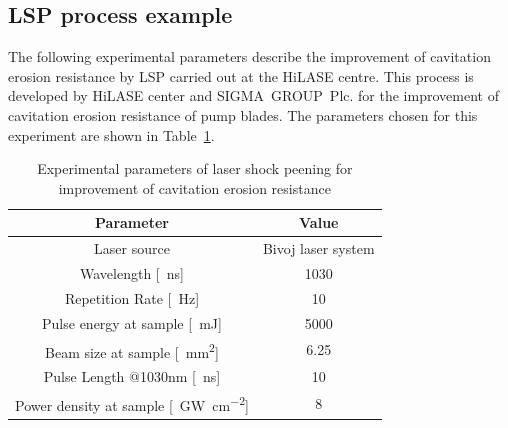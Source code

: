 \subsection{LSP process example}

The following experimental parameters describe the improvement of cavitation erosion resistance by LSP carried out at the HiLASE centre. This process is developed by HiLASE center and SIGMA~GROUP~Plc. for the improvement of cavitation erosion resistance of pump blades. The parameters chosen for this experiment are shown in Table~\ref{experimentalparameters}. 

\begin{table}[H]
\centering
    
    \begin{threeparttable}
            \caption[Experimental parameters of laser shock peening]{Experimental parameters of laser shock peening for improvement of cavitation erosion resistance}
        \begin{tabular}{|c | c|} 
        \hline
            \textbf{Parameter} & \textbf{Value} \\ [0.5ex] 
        \hline
        Laser source & Bivoj laser system  \\
        \hline
        Wavelength [\SI{}{\nano\second}] & 1030 \\
        \hline
        Repetition Rate [\SI{}{\hertz}] & 10  \\ 
        \hline
            Pulse energy at sample [\SI{}{\milli\joule}] & 5000 \\
        \hline
            Beam size at sample [\SI{}{\mm\squared}] & 6.25 \\
        \hline
            Pulse Length @1030nm [\SI{}{\nano\second}] & 10 \\
        \hline
            Power density at sample [\SI{}{\giga\watt\per\cm\squared}] & 8 \\

        \hline
        \end{tabular}


        \label{experimentalparameters}
    \end{threeparttable}
\end{table}

